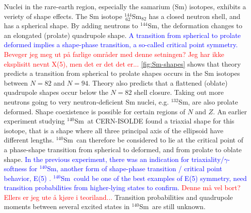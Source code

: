 \documentclass[twoside,english]{uiofysmaster/uiofysmaster}
\newcommand{\Sm}{$^{140}$Sm} %
\newcommand{\ga}{$\gamma$}
\let\orgautoref\autoref
\renewcommand{\autoref}
        {%
		 \def\sectionautorefname{Section}%
		 \def\subsectionautorefname{Section}%
		 \def\subsubsectionautorefname{Section}%
		 \def\chapterautorefname{Chapter}%
          \orgautoref}
\begin{document}
Nuclei in the rare-earth region, especially the samarium (Sm) isotopes, exhibits a veriety of shape effects. 
The Sm isotope $^{144}_{~62}$Sm$_{82}$ has a closed neutron shell, and has a spherical shape.
By adding neutrons to $^{144}$Sm, the deformation changes to an elongated (prolate) quadrupole shape. 
\textcolor{blue}{A transition from spherical to prolate deformed implies a shape-phase transition, a so-called critical point symmetry.} \textcolor{red}{Beveger jeg meg ut på farlige områder med denne setningen? Jeg har ikke eksplisitt nevnt X(5), men det er det det er...}
\autoref{fig:Sm-shapes} shows that theory predicts a transition from spherical to prolate shapes occurs in the Sm isotopes between $N = 82$ and $N = 94$.
Theory also predicts that a flattened (oblate) quadrupole shapes occur below the $N = 82$ shell closure. 
Taking out more neutrons going to very neutron-deficient Sm nuclei, e.g. $^{132}$Sm, are also prolate deformed. 
Shape coexistence is possible for certain regions of $N$ and $Z$.
An earlier experiment studying \Sm\ at CERN-ISOLDE found a triaxial shape for this isotope, that is a shape where all three principal axis of the ellipsoid have different lengths.
\Sm\ can therefore be considered to lie at the critical point of a phase-shape transition from spherical to deformed, and from prolate to oblate shape.
\textcolor{blue}{In the previous experiment, there was an indication for triaxiality/\ga-softness \cite{Klintefjord} for \Sm, another form of shape-phase transition / critical point behavior, E(5) \cite{Iachello2000}. 
\Sm\ could be one of the best examples of E(5) symmetry, need transition probabilities from higher-lying states to confirm.} \textcolor{red}{Denne må vel bort? Ellers er jeg ute å kjøre i teoriland...}
Transition probabilities and quadrupole moments between several excited states in \Sm\ are still unknown.
\end{document}
